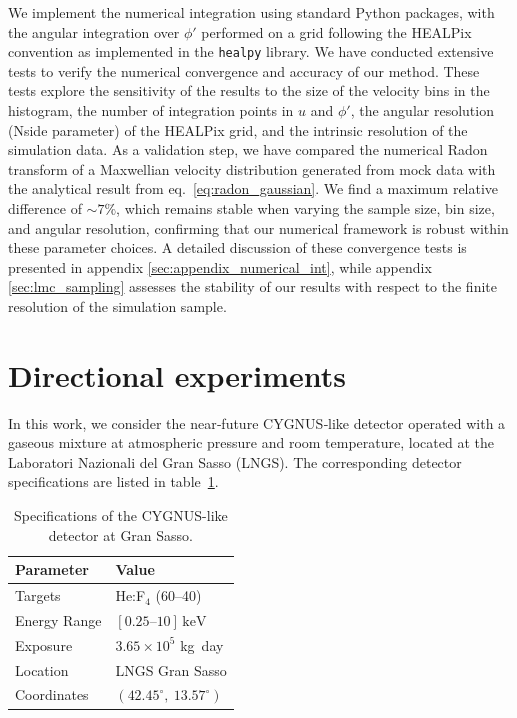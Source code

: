 \documentclass[a4paper,11pt]{article}
\begin{document}
We implement the numerical integration using standard Python packages, with the angular integration over \(\phi'\) performed on a grid following the HEALPix convention \cite{Gorski:2004by} as implemented in the \texttt{healpy} library. We have conducted extensive tests to verify the numerical convergence and accuracy of our method. These tests explore the sensitivity of the results to the size of the velocity bins in the histogram, the number of integration points in \(u\) and \(\phi'\), the angular resolution (Nside parameter) of the HEALPix grid, and the intrinsic resolution of the simulation data. As a validation step, we have compared the numerical Radon transform of a Maxwellian velocity distribution generated from mock data with the analytical result from eq.~\eqref{eq:radon_gaussian}. We find a maximum relative difference of $\sim 7\%$, which remains stable when varying the sample size, bin size, and angular resolution, confirming that our numerical framework is robust within these parameter choices. A detailed discussion of these convergence tests is presented in appendix \ref{sec:appendix_numerical_int}, while appendix \ref{sec:lmc_sampling} assesses the stability of our results with respect to the finite resolution of the simulation sample.




\section{Directional experiments}
\label{sec:experiments}


In this work, we consider the near‑future CYGNUS‑like detector operated with a gaseous mixture at atmospheric pressure and room temperature, located at the Laboratori
Nazionali del Gran Sasso (LNGS). The corresponding detector specifications are listed in table~\ref{tab:cygnus_gransasso}.

\begin{table}[htbp]
\centering
\begin{tabular}{ll}
\hline
\textbf{Parameter} & \textbf{Value} \\
\hline
Targets & He:F$_4$ (60–40) \\ 
Energy Range & $[0.25\text{--}10]\,\mathrm{keV}$ \\
Exposure & $3.65 \times 10^{5}$  kg~day \\
Location & LNGS Gran Sasso \\
Coordinates & $(42.45^\circ,\ 13.57^\circ)$ \\
\hline
\end{tabular}
\caption{Specifications of the CYGNUS-like detector at Gran Sasso.}
\label{tab:cygnus_gransasso}
\end{table}
\end{document}
